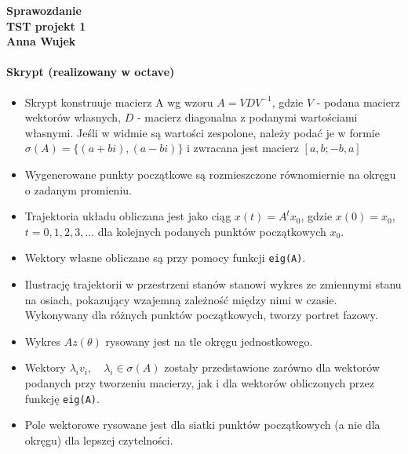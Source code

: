 \documentclass[a4paper, 12pt]{article}
\begin{document}
	\begin{center}
		
		\textbf{Sprawozdanie\\TST projekt 1\\Anna Wujek}
	\end{center}
	
	\paragraph{Skrypt (realizowany w octave)}
	\begin{itemize}
		\item Skrypt konstruuje macierz A wg wzoru $A = VDV^{-1}$, gdzie $V$ - podana macierz wektorów własnych, $D$ - macierz diagonalna z podanymi wartościami własnymi. Jeśli w widmie są wartości zespolone, należy podać je w formie $\sigma(A)=\{(a+bi),(a-bi)\}$ i zwracana jest macierz $[a,b;-b,a]$
		\item Wygenerowane punkty początkowe są rozmieszczone równomiernie na okręgu o zadanym promieniu.
		\item Trajektoria układu obliczana jest jako ciąg $x(t)=A^tx_0$, gdzie $x(0)=x_0$, $t = 0,1,2,3,...$ dla kolejnych podanych punktów początkowych $x_0$.
		\item Wektory własne obliczane są przy pomocy funkcji \verb|eig(A)|.
		\item Ilustrację trajektorii w przestrzeni stanów stanowi wykres ze zmiennymi stanu na osiach, pokazujący wzajemną zależność między nimi w czasie. Wykonywany dla różnych punktów początkowych, tworzy portret fazowy.
		\item Wykres $Az(\theta)$ rysowany jest na tle okręgu jednostkowego.
		\item Wektory $\lambda _iv_i,\quad \lambda _i \in \sigma (A)$ zostały przedstawione zarówno dla wektorów podanych przy tworzeniu macierzy, jak i dla wektorów obliczonych przez funkcję \verb|eig(A)|.
		\item Pole wektorowe rysowane jest dla siatki punktów początkowych (a nie dla okręgu) dla lepszej czytelności.
	\end{itemize}
	
\end{document}

